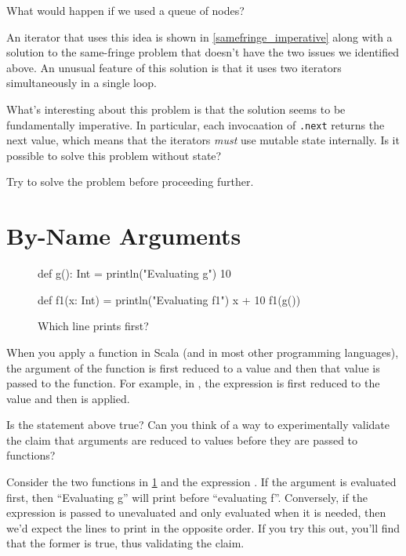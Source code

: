 \documentclass[9pt]{extbook}
\begin{document}
\begin{think}
What would happen if we used a queue of nodes?
\end{think}

An iterator that uses this idea is shown in \cref{samefringe_imperative} along with a
solution to the same-fringe problem that doesn't have the two issues we identified
above. An unusual feature of this solution is that it uses two iterators simultaneously
in a single loop.

What's interesting about this problem is that the solution seems to be fundamentally
imperative. In particular, each invocaation of \verb|.next| returns the next value, which
means that the iterators \emph{must} use mutable state internally. Is it possible to solve
this problem without state?

\begin{think}
  Try to solve the problem before proceeding further.
\end{think}

\section{By-Name Arguments}

\begin{figure}
\begin{scalacode}
def g(): Int = {
  println("Evaluating g")
  10
}

def f1(x: Int) = {
  println("Evaluating f1")
  x + 10
}
f1(g())
\end{scalacode}
\caption{Which line prints first?}
\label{evalorder1}
\end{figure}

When you apply a function in Scala (and in most other programming languages), the argument
of the function is first reduced to a value and then that value is passed to the function.
For example, in , the expression  is first reduced
to the value  and then  is applied.

\begin{think}
  Is the statement above true? Can you think of a way to experimentally validate the
  claim that arguments are reduced to values before they are passed to functions?
 \end{think}

Consider the two functions in \cref{evalorder1} and the expression
.  If the argument is evaluated first, then
``Evaluating g'' will print before ``evaluating f''. Conversely, if
the expression  is passed to  unevaluated
and only evaluated when it is needed, then we'd expect the lines to print in the opposite
order. If you try this out, you'll find that the former is true, thus validating the
claim.
\end{document}
